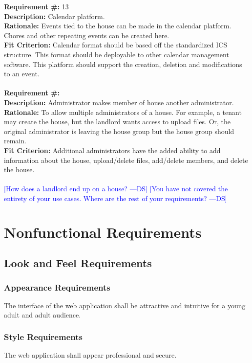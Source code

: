 \documentclass[12pt]{article}
\newcommand{\authornote}[3]{\textcolor{#1}{[#3 ---#2]}}
\newcommand{\authornote}[3]{}
\newcommand{\ds}[1]{\authornote{blue}{DS}{#1}}
\begin{document}
{\textbf{Requirement \#:} 13
       \\
      \textbf{Description: }{Calendar platform.} \\
      \textbf{Rationale: }{Events tied to the house can be made in the calendar 
platform. Chores and other repeating events can be created here.} \\
      \textbf{Fit Criterion: }{Calendar format should be based off the 
standardized ICS structure. This format should be deployable to other calendar 
management software. This platform should support the creation, deletion and 
modifications to an event.} \\ \\
\textbf{Requirement \#:}  
       \\
      \textbf{Description:} Administrator makes member of house another administrator. \\
      \textbf{Rationale:} To allow multiple administrators of a house. For example, a tenant may create the house, but the landlord wants access to upload files. Or, the original administrator is leaving the house group but the house group should remain. \\
      \textbf{Fit Criterion:} Additional administrators have the added ability to add information about the house, upload/delete files, add/delete members, and delete the house.\\ \\
\ds{How does a landlord end up on a house?}
\ds{You have not covered the entirety of your use cases. Where are the rest of
	your requirements?}
        
\section{Nonfunctional Requirements}
\subsection{Look and Feel Requirements}
\subsubsection{Appearance Requirements}
The interface of the web application shall be attractive and intuitive for a 
young adult and adult audience.

\subsubsection{Style Requirements}
The web application shall appear professional and secure.

}
\end{document}
